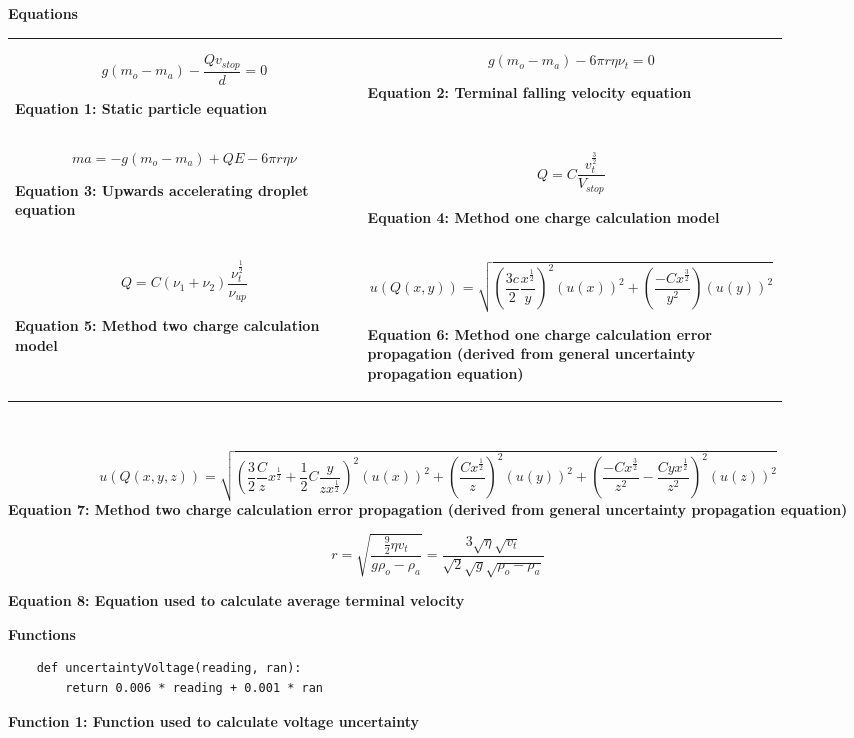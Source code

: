 \documentclass[
	letterpaper, %
	10pt, %
]{CSUniSchoolLabReport}
\begin{document}
{\Large\textbf{Equations}}\\

\begin{tabular}{p{0.45\linewidth} p{0.45\linewidth}}
    $$g(m_o-m_a)-\frac{Qv_{stop}}{d}=0$$
    \begin{center}
        \textbf{Equation 1: Static particle equation}
    \end{center}
    &
    $$g(m_o-m_a)-6\pi r \eta\nu_t=0$$
    \begin{center}
        \textbf{Equation 2: Terminal falling velocity equation}
    \end{center}
    \\
    $$ma=-g(m_o-m_a)+QE- 6\pi r \eta\nu$$
    \begin{center}
        \textbf{Equation 3: Upwards accelerating droplet equation}
    \end{center}
    &
    $$Q = C \frac{v_t^{\frac{3}{2}}}{V_{stop}}$$
    \begin{center}
        \textbf{Equation 4: Method one charge calculation model}
    \end{center}
    \\
    $$Q = C(\nu_1 + \nu_2)\frac{\nu_t^\frac{1}{2}}{\nu_{up}}$$
    \begin{center}
        \textbf{Equation 5: Method two charge calculation model}
    \end{center}
    &
    $$u(Q(x,y)) = \sqrt{\left(\frac{3c}{2}\frac{x^\frac{1}{2}}{y}\right)^2(u(x))^2 + \left(\frac{-Cx^\frac{3}{2}}{y^2}\right)(u(y))^2}$$
    \begin{center}
        \textbf{Equation 6: Method one charge calculation error propagation (derived from general uncertainty propagation equation)}
    \end{center}
\end{tabular}\\
\begin{center}
    $$u(Q(x,y,z)) =
    \sqrt{
        \left(
            \frac{3}{2}\frac{C}{z}x^\frac12 + \frac{1}{2}C\frac{y}{zx^\frac12}
        \right)^2(u(x))^2 +
        \left(
            \frac{Cx^\frac{1}{2}}{z}
        \right)^2(u(y))^2 +
        \left(
            \frac{-Cx^\frac{3}{2}}{z^2} - \frac{Cyx^\frac12}{z^2}
        \right) ^2 (u(z))^2
    }
    $$
    \textbf{Equation 7: Method two charge calculation error propagation (derived from general uncertainty propagation equation)}
\end{center}

$$r = \sqrt{\frac{\frac 92 \eta v_t}{g\rho_o-\rho_a}} = \frac{3\sqrt \eta\sqrt{v_t}}{\sqrt 2 \sqrt g \sqrt{\rho_o - \rho_a}}$$
\begin{center}
    \textbf{Equation 8: Equation used to calculate average terminal velocity}
\end{center}
\newpage
{\Large\textbf{Functions}}\\
\begin{verbatim}
    def uncertaintyVoltage(reading, ran):
        return 0.006 * reading + 0.001 * ran
\end{verbatim}
\begin{center}
    \textbf{Function 1: Function used to calculate voltage uncertainty}
\end{center}
\end{document}
